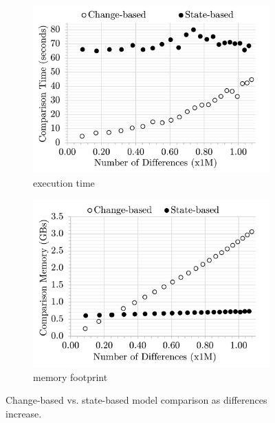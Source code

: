 \documentclass{llncs}
\begin{document}
\begin{figure}[ht]
    \centering
    \begin{subfigure}[t]{0.495\linewidth}
        \includegraphics[width=\linewidth]{images/Time-Diffs}
        \caption{execution time}
        \label{fig:time_diffs}
    \end{subfigure}
    \hfill
    \begin{subfigure}[t]{0.495\linewidth}
        \includegraphics[width=\linewidth]{images/Memory-Diffs}
        \caption{memory footprint}
        \label{fig:memory_diffs}
    \end{subfigure}
    \caption{Change-based vs. state-based model comparison as differences increase.}
    \label{fig:change_vs_state}
\end{figure}
\end{document}

